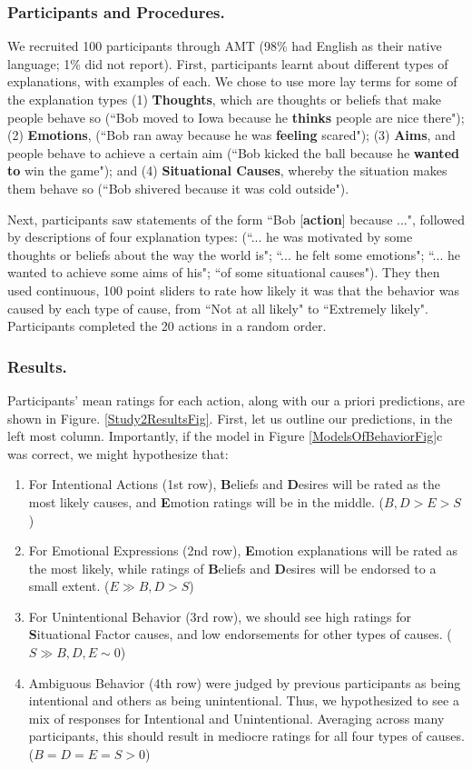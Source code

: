 \documentclass[10pt,letterpaper]{article}
\begin{document}
\subsubsection{Participants and Procedures.} 
We recruited 100 participants through AMT (98\% had English as their native language; 1\% did not report).
First, participants learnt about different types of explanations, with examples of each. We chose to use more lay terms for some of the explanation types (1) \textbf{Thoughts}, which are thoughts or beliefs that make people behave so (``Bob moved to Iowa because he \textbf{thinks} people are nice there"); (2) \textbf{Emotions}, (``Bob ran away because he was \textbf{feeling} scared"); (3) \textbf{Aims}, and people behave to achieve a certain aim (``Bob kicked the ball because he \textbf{wanted to} win the game"); and (4) \textbf{Situational Causes}, whereby the situation makes them behave so (``Bob shivered because it was cold outside").

Next, participants saw statements of the form ``Bob [\textbf{action}] because ...", followed by descriptions of four explanation types: (``... he was motivated by some thoughts or beliefs about the way the world is"; ``... he felt some emotions"; ``... he wanted to achieve some aims of his"; ``of some situational causes"). They then used continuous, 100 point sliders to rate how likely it was that the behavior was caused by each type of cause, from ``Not at all likely" to ``Extremely likely". Participants completed the 20 actions in a random order.


\subsubsection{Results.} 
Participants' mean ratings for each action, along with our a priori predictions, are shown in Figure. \ref{Study2ResultsFig}. First, let us outline our predictions, in the left most column. Importantly, if the model in Figure \ref{ModelsOfBehaviorFig}c was correct, we might hypothesize that: 
\begin{enumerate}
\item For Intentional Actions (1st row), \textbf{B}eliefs and \textbf{D}esires will be rated as the most likely causes, and \textbf{E}motion ratings will be in the middle. ($B,D>E>S$)
\item For Emotional Expressions (2nd row), \textbf{E}motion explanations will be rated as the most likely, while ratings of \textbf{B}eliefs and \textbf{D}esires will be endorsed to a small extent. ($E \gg B,D>S$)
\item For Unintentional Behavior (3rd row), we should see high ratings for \textbf{S}ituational Factor causes, and low endorsements for other types of causes. ($S\gg B,D,E \sim 0$)
\item Ambiguous Behavior (4th row) were judged by previous participants \cite{Malle1999} as being intentional and others as being unintentional. Thus, we hypothesized to see a mix of responses for Intentional and Unintentional. Averaging across many participants, this should result in mediocre ratings for all four types of causes. ($B=D=E=S > 0$)
\end{enumerate}
\end{document}
